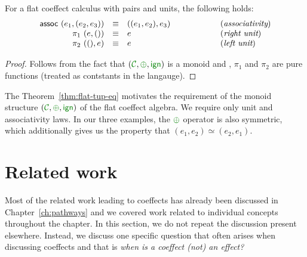 \begin{theorem}
\label{thm:flat-tup-eq}
For a flat coeffect calculus with pairs and units, the following holds:
%
\begin{equation*}
\begin{array}{rclcl}
 \textnormal{\sffamily assoc}~(e_1, (e_2, e_3)) &\equiv& ((e_1, e_2), e_3) &\qquad\qquad&(\emph{associativity}) \\
 \pi_1~(e, ()) &\equiv& e &&(\emph{right unit})\\
 \pi_2~((), e) &\equiv& e &&(\emph{left unit})\\
\end{array} 
\end{equation*}
\end{theorem}
\begin{proof}
Follows from the fact that $(\C, \cpar, \czero)$ is a monoid and , $\pi_1$ and
$\pi_2$ are pure functions (treated as contstants in the langauge).
\end{proof}

\noindent
The Theorem~\ref{thm:flat-tup-eq} motivates the requirement of the monoid structure 
$(\C, \cpar, \czero)$ of the flat coeffect algebra. We require only unit and associativity
laws. In our three examples, the $\cpar$ operator is also symmetric, which additionally
gives us the property that $(e_1, e_2) \simeq (e_2, e_1)$.




%                                                 
%

\section{Related work}
\label{sec:flat-related}

Most of the related work leading to coeffects has already been discussed in Chapter~\ref{ch:pathways} 
and we covered work related to individual concepts throughout the chapter. In this section, we
do not repeat the discussion present elsewhere. Instead, we discuss one specific question that often 
arises when discussing coeffects and that is \emph{when is a coeffect (not) an effect?}


